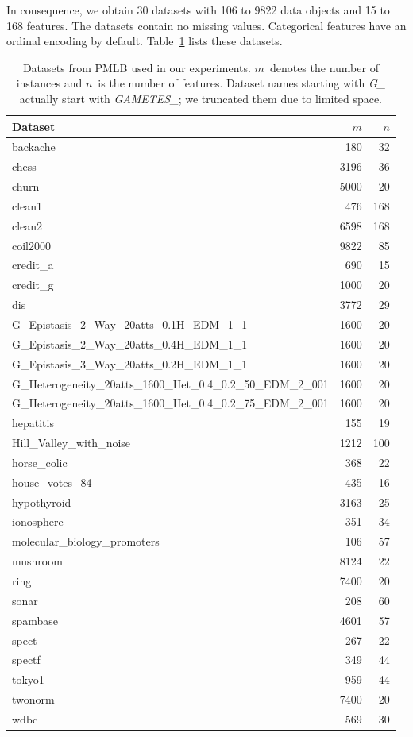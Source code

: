 \documentclass{article}
\theoremstyle{definition}
\begin{document}
In consequence, we obtain 30 datasets with 106 to 9822 data objects and 15 to 168 features.
The datasets contain no missing values.
Categorical features have an ordinal encoding by default.
Table~\ref{tab:afs:datasets} lists these datasets.
%
\begin{table}[htbp]
	\centering
	\begin{tabular}{lrr}
		\toprule
		Dataset &  $m$ & $n$ \\
		\midrule
		backache &  180 &  32 \\
		chess & 3196 &  36 \\
		churn & 5000 &  20 \\
		clean1 &  476 & 168 \\
		clean2 & 6598 & 168 \\
		coil2000 & 9822 &  85 \\
		credit\_a &  690 &  15 \\
		credit\_g & 1000 &  20 \\
		dis & 3772 &  29 \\
		G\_Epistasis\_2\_Way\_20atts\_0.1H\_EDM\_1\_1 & 1600 &  20 \\
		G\_Epistasis\_2\_Way\_20atts\_0.4H\_EDM\_1\_1 & 1600 &  20 \\
		G\_Epistasis\_3\_Way\_20atts\_0.2H\_EDM\_1\_1 & 1600 &  20 \\
		G\_Heterogeneity\_20atts\_1600\_Het\_0.4\_0.2\_50\_EDM\_2\_001 & 1600 &  20 \\
		G\_Heterogeneity\_20atts\_1600\_Het\_0.4\_0.2\_75\_EDM\_2\_001 & 1600 &  20 \\
		hepatitis &  155 &  19 \\
		Hill\_Valley\_with\_noise & 1212 & 100 \\
		horse\_colic &  368 &  22 \\
		house\_votes\_84 &  435 &  16 \\
		hypothyroid & 3163 &  25 \\
		ionosphere &  351 &  34 \\
		molecular\_biology\_promoters &  106 &  57 \\
		mushroom & 8124 &  22 \\
		ring & 7400 &  20 \\
		sonar &  208 &  60 \\
		spambase & 4601 &  57 \\
		spect &  267 &  22 \\
		spectf &  349 &  44 \\
		tokyo1 &  959 &  44 \\
		twonorm & 7400 &  20 \\
		wdbc &  569 &  30 \\
		\bottomrule
	\end{tabular}
	\caption{
		Datasets from PMLB used in our experiments. $m$~denotes the number of instances and $n$~is the number of features.
		Dataset names starting with \emph{G\_} actually start with \emph{GAMETES\_}; we truncated them due to limited space.
	}
	\label{tab:afs:datasets}
\end{table}
\end{document}

